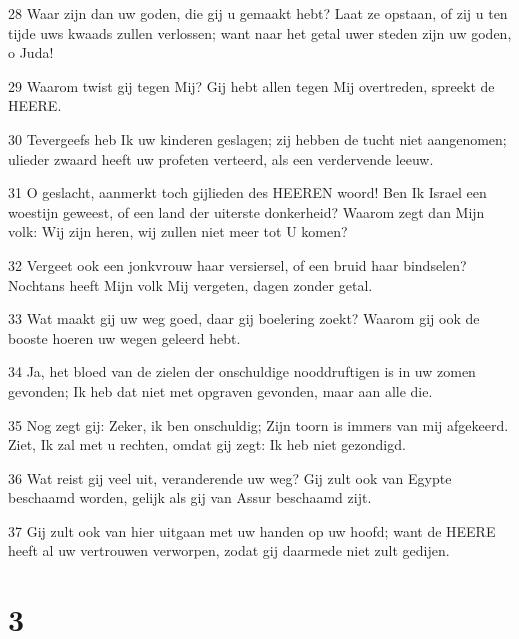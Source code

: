 \par 28 Waar zijn dan uw goden, die gij u gemaakt hebt? Laat ze opstaan, of zij u ten tijde uws kwaads zullen verlossen; want naar het getal uwer steden zijn uw goden, o Juda!
\par 29 Waarom twist gij tegen Mij? Gij hebt allen tegen Mij overtreden, spreekt de HEERE.
\par 30 Tevergeefs heb Ik uw kinderen geslagen; zij hebben de tucht niet aangenomen; ulieder zwaard heeft uw profeten verteerd, als een verdervende leeuw.
\par 31 O geslacht, aanmerkt toch gijlieden des HEEREN woord! Ben Ik Israel een woestijn geweest, of een land der uiterste donkerheid? Waarom zegt dan Mijn volk: Wij zijn heren, wij zullen niet meer tot U komen?
\par 32 Vergeet ook een jonkvrouw haar versiersel, of een bruid haar bindselen? Nochtans heeft Mijn volk Mij vergeten, dagen zonder getal.
\par 33 Wat maakt gij uw weg goed, daar gij boelering zoekt? Waarom gij ook de booste hoeren uw wegen geleerd hebt.
\par 34 Ja, het bloed van de zielen der onschuldige nooddruftigen is in uw zomen gevonden; Ik heb dat niet met opgraven gevonden, maar aan alle die.
\par 35 Nog zegt gij: Zeker, ik ben onschuldig; Zijn toorn is immers van mij afgekeerd. Ziet, Ik zal met u rechten, omdat gij zegt: Ik heb niet gezondigd.
\par 36 Wat reist gij veel uit, veranderende uw weg? Gij zult ook van Egypte beschaamd worden, gelijk als gij van Assur beschaamd zijt.
\par 37 Gij zult ook van hier uitgaan met uw handen op uw hoofd; want de HEERE heeft al uw vertrouwen verworpen, zodat gij daarmede niet zult gedijen.

\chapter{3}

